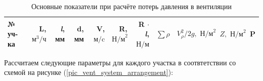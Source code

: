\begin{table}
    \centering
    \begin{tabular}{|l|r|r|r|r|r|r|r|r|r|r|}
    \hline
        № уч-ка & L, $\text{м}^3/\text{ч}$  & \textit{l}, мм & d, мм                & V, $\text{м/c}$
        & R, $\text{Н/м}^2$                 & R $\cdot$ \textit{l}, $\text{Н/м}$    & $\sum \rho$
        & $V_{\rho}^2 / 2g, \text{ Н/м}^2$  & $Z, \text{ Н/м}^2$                    & P                 \\
    \hline


    \end{tabular}
    \caption{Основные показатели при расчёте потерь давления в вентиляции}
    \label{pressure_drop_calc_parameters}
\end{table}

Рассчитаем следующие параметры для каждого участка в соотвтетствии со схемой на
рисунке (\ref{pic_vent_system_arrangement}):

